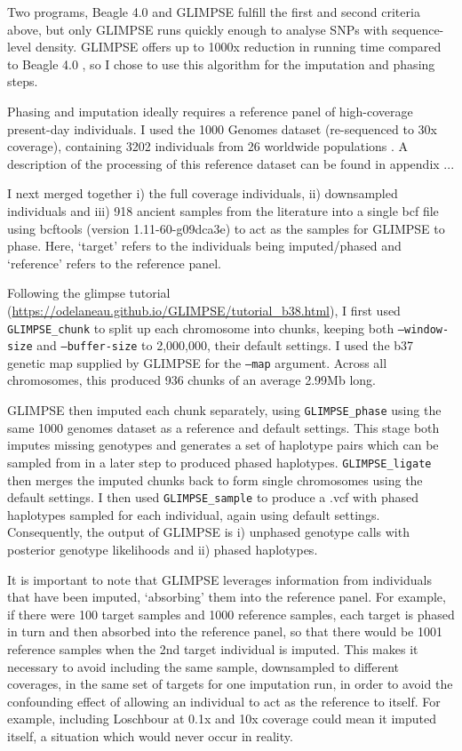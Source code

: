 Two programs, Beagle 4.0 \cite{Browning2007} and GLIMPSE \cite{rubinacci2021efficient} fulfill the first and second criteria above, but only GLIMPSE runs quickly enough to analyse SNPs with sequence-level density. GLIMPSE offers up to 1000x reduction in running time compared to Beagle 4.0 \cite{rubinacci2021efficient}, so I chose to use this algorithm for the imputation and phasing steps.   

Phasing and imputation ideally requires a reference panel of high-coverage present-day individuals. I used the 1000 Genomes dataset (re-sequenced to 30x coverage), containing 3202 individuals from 26 worldwide populations \cite{byrska2021high}. A description of the processing of this reference dataset can be found in appendix ...

I next merged together i) the full coverage individuals, ii) downsampled individuals and iii) 918 ancient samples from the literature into a single bcf file using bcftools (version 1.11-60-g09dca3e) \cite{li2011statistical} to act as the samples for GLIMPSE to phase. Here, `target' refers to the individuals being imputed/phased and `reference' refers to the reference panel.  

Following the glimpse tutorial (\url{https://odelaneau.github.io/GLIMPSE/tutorial_b38.html}), I first used \texttt{GLIMPSE\_chunk} to split up each  chromosome into chunks, keeping both \texttt{--window-size} and \texttt{--buffer-size} to 2,000,000, their default settings. I used the b37 genetic map supplied by GLIMPSE for the \texttt{--map} argument. Across all chromosomes, this produced 936 chunks of an average 2.99Mb long. 

GLIMPSE then imputed each chunk separately, using \texttt{GLIMPSE\_phase} using the same 1000 genomes dataset as a reference and default settings. This stage both imputes missing genotypes and generates a set of haplotype pairs which can be sampled from in a later step to produced phased haplotypes. \texttt{GLIMPSE\_ligate} then merges the imputed chunks back to form single chromosomes using the default settings. I then used \texttt{GLIMPSE\_sample} to produce a .vcf with phased haplotypes sampled for each individual, again using default settings. Consequently, the output of GLIMPSE is i) unphased genotype calls with posterior genotype likelihoods and ii) phased haplotypes.

It is important to note that GLIMPSE leverages information from individuals that have been imputed, `absorbing' them into the reference panel. For example, if there were 100 target samples and 1000 reference samples, each target is phased in turn and then absorbed into the reference panel, so that there would be 1001 reference samples when the 2nd target individual is imputed. This makes it necessary to avoid including the same sample, downsampled to different coverages, in the same set of targets for one imputation run, in order to avoid the confounding effect of allowing an individual to act as the reference to itself. For example, including Loschbour at 0.1x and 10x coverage could mean it imputed itself, a situation which would never occur in reality. 

